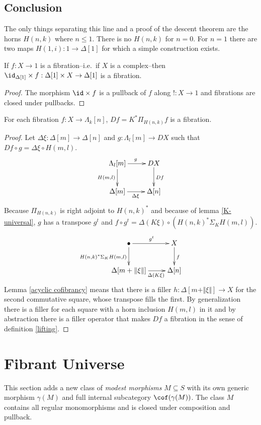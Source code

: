 \documentclass{tac}
\newcommand\ri{^*}
\newcommand\bang{!}
\newcommand\of{:}
\newcommand\simplex\Delta
\newcommand\horn\Lambda
\newcommand\gen\gamma
\newcommand\norm[1]{\Vert #1 \Vert}
\newcommand\depprod{\Pi_}
\newcommand\depsum{\Sigma_}
\begin{document}
\subsection{Conclusion}
The only things separating this line and a proof of the descent theorem are the horns $H(n,k)$ where $n\leq 1$. There is no $H(n,k)$ for $n=0$. For $n=1$ there are two maps $H(1,i)\of 1\to \simplex[1]$ for which a simple construction exists.

\begin{lemma} If $f\of X\to 1$ is a fibration--i.e.\ if $X$ is a complex--then $\id_{\simplex[1]}\times f\of\simplex[1]\times X\to \simplex[1]$ is a fibration. \end{lemma}

\begin{proof} The morphism $\id\times f$ is a pullback of $f$ along $\bang\of X\to 1$ and fibrations are closed under pullbacks. \end{proof}

\begin{theorem} For each fibration $f\of X\to\horn_k[n]$, $Df=K\ri\depprod{H(n,k)}f$ is a fibration. \label{descent} \end{theorem}


\begin{proof} Let $\simplex\xi\of \simplex[m]\to\simplex[n]$ and $g\of \horn_l[m]\to DX$ such that $Df\circ g = \simplex\xi\circ H(m,l)$. 
\[
	\xymatrix{
		\horn_l[m]\ar[r]^g\ar[d]_{H(m,l)} & DX\ar[d]^{Df} \\
		\simplex[m]\ar[r]_{\simplex\xi} & \simplex[n]
	}	
\]
Because $\depprod{H(n,k)}$ is right adjoint to $H(n,k)\ri$ and because of lemma \ref{K-universal}, $g$ has a transpose $g^t$ and $f\circ g^t = \simplex(K\xi)\circ (H(n,k)\ri \depsum{K} H(m,l))$.
\[
	\xymatrix{
		\bullet\ar[r]^{g^t}\ar[d]_{H(n,k)\ri \depsum K H(m,l)} & X\ar[d]^{f} \\
		\simplex[m+\norm\xi]\ar[r]_(.6){\simplex(K\xi)} & \simplex[n]
	}	
\]
Lemma \ref{acyclic cofibrancy} means that there is a filler $h\of \simplex[m+\norm\xi]\to X$ for the second commutative square, whose transpose fills the first.
By generalization there is a filler for each square with a horn inclusion $H(m,l)$ in it and by abstraction there is a filler operator that makes $Df$ a fibration in the sense of definition \ref{lifting}.
\end{proof}

\section{Fibrant Universe}
This section adds a new class of \emph{modest morphisms} $M\subseteq S$ with its own generic morphism $\gen(M)$ and full internal subcategory $\cof(\gen(M))$. The class $M$ contains all regular monomorphisms and is closed under composition and pullback.
\end{document}
